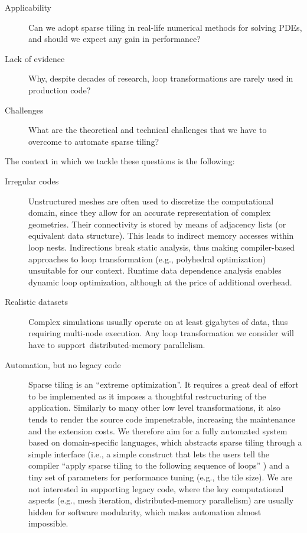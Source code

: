 \begin{description}
\item[Applicability] Can we adopt sparse tiling in real-life numerical methods for solving PDEs, and should we expect any gain in performance?
\item[Lack of evidence] Why, despite decades of research, loop transformations are rarely used in production code? 
\item[Challenges] What are the theoretical and technical challenges that we have to overcome to automate sparse tiling?
\end{description}

The context in which we tackle these questions is the following:
\begin{description}
\item[Irregular codes] Unstructured meshes are often used to discretize the computational domain, since they allow for an accurate representation of complex geometries. Their connectivity is stored by means of adjacency lists (or equivalent data structure). This leads to indirect memory accesses within loop nests. Indirections break static analysis, thus making compiler-based approaches to loop transformation (e.g., polyhedral optimization) unsuitable for our context. Runtime data dependence analysis enables dynamic loop optimization, although at the price of additional overhead.
\item[Realistic datasets] Complex simulations usually operate on at least gigabytes of data, thus requiring multi-node execution. Any loop transformation we consider will have to support\ distributed-memory parallelism.
\item[Automation, but no legacy code] Sparse tiling is an ``extreme optimization''. It requires a great deal of effort to be implemented as it imposes a thoughtful restructuring of the application. Similarly to many other low level transformations, it also tends to render the source code impenetrable, increasing the maintenance and the extension costs. We therefore aim for a fully automated system based on domain-specific languages, which abstracts sparse tiling through a simple interface (i.e., a simple construct that lets the users tell the compiler ``apply sparse tiling to the following sequence of loops'' ) and a tiny set of parameters for performance tuning (e.g., the tile size). We are not interested in supporting legacy code, where the key computational aspects (e.g., mesh iteration, distributed-memory parallelism) are usually hidden for software modularity, which makes automation almost impossible.
\end{description}

